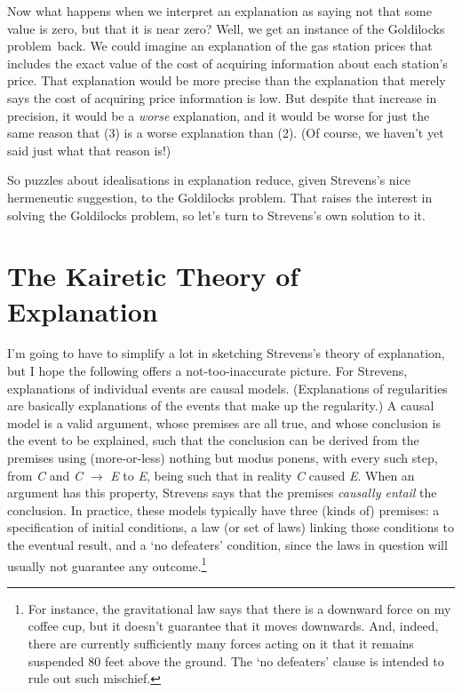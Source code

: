 \documentclass[
  10pt,
  letterpaper,
  DIV=11,
  numbers=noendperiod,
  twoside]{scrartcl}
\begin{document}
Now what happens when we interpret an explanation as saying not that
some value is zero, but that it is near zero? Well, we get an instance
of the Goldilocks problem~back. We could imagine an explanation of the
gas station prices that includes the exact value of the cost of
acquiring information about each station's price. That explanation would
be more precise than the explanation that merely says the cost of
acquiring price information is low. But despite that increase in
precision, it would be a \emph{worse} explanation, and it would be worse
for just the same reason that (3) is a worse explanation than (2). (Of
course, we haven't yet said just what that reason is!)

So puzzles about idealisations in explanation reduce, given Strevens's
nice hermeneutic suggestion, to the Goldilocks problem. That raises the
interest in solving the Goldilocks problem, so let's turn to Strevens's
own solution to it.

\section{The Kairetic Theory of
Explanation}\label{the-kairetic-theory-of-explanation}

I'm going to have to simplify a lot in sketching Strevens's theory of
explanation, but I hope the following offers a not-too-inaccurate
picture. For Strevens, explanations of individual events are causal
models. (Explanations of regularities are basically explanations of the
events that make up the regularity.) A causal model is a valid argument,
whose premises are all true, and whose conclusion is the event to be
explained, such that the conclusion can be derived from the premises
using (more-or-less) nothing but modus ponens, with every such step,
from \emph{C} and \emph{C} \(\rightarrow\) \emph{E} to \emph{E}, being
such that in reality \emph{C} caused \emph{E}. When an argument has this
property, Strevens says that the premises \emph{causally entail} the
conclusion. In practice, these models typically have three (kinds of)
premises: a specification of initial conditions, a law (or set of laws)
linking those conditions to the eventual result, and a `no defeaters'
condition, since the laws in question will usually not guarantee any
outcome.\footnote{For instance, the gravitational law says that there is
  a downward force on my coffee cup, but it doesn't guarantee that it
  moves downwards. And, indeed, there are currently sufficiently many
  forces acting on it that it remains suspended 80 feet above the
  ground. The `no defeaters' clause is intended to rule out such
  mischief.}
\end{document}
